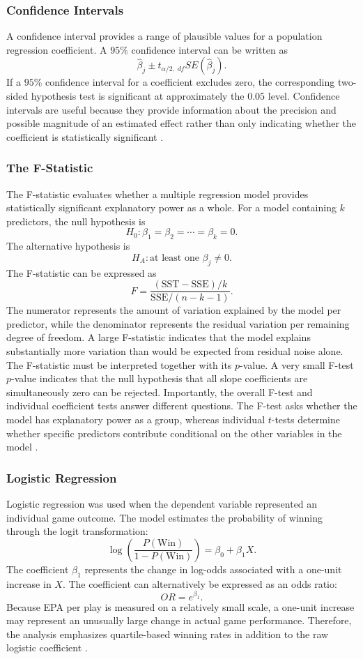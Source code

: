 \documentclass[11pt]{article}
\begin{document}
\subsubsection*{Confidence Intervals} 
A confidence interval provides a range of plausible values for a population regression coefficient. A $95\%$ confidence interval can be written as \[ \hat{\beta}_j \pm t_{\alpha/2,\;df} SE(\hat{\beta}_j). \] If a $95\%$ confidence interval for a coefficient excludes zero, the corresponding two-sided hypothesis test is significant at approximately the $0.05$ level. Confidence intervals are useful because they provide information about the precision and possible magnitude of an estimated effect rather than only indicating whether the coefficient is statistically significant \cite{confidence_intervals}.

\subsubsection*{The F-Statistic} 
The F-statistic evaluates whether a multiple regression model provides statistically significant explanatory power as a whole. For a model containing $k$ predictors, the null hypothesis is \[ H_0: \beta_1=\beta_2=\cdots=\beta_k=0. \] The alternative hypothesis is \[ H_A: \text{at least one }\beta_j\neq0. \] The F-statistic can be expressed as \[ F = \frac{(\mathrm{SST}-\mathrm{SSE})/k} {\mathrm{SSE}/(n-k-1)}. \] The numerator represents the amount of variation explained by the model per predictor, while the denominator represents the residual variation per remaining degree of freedom. A large F-statistic indicates that the model explains substantially more variation than would be expected from residual noise alone. The F-statistic must be interpreted together with its $p$-value. A very small F-test $p$-value indicates that the null hypothesis that all slope coefficients are simultaneously zero can be rejected. Importantly, the overall F-test and individual coefficient tests answer different questions. The F-test asks whether the model has explanatory power as a group, whereas individual $t$-tests determine whether specific predictors contribute conditional on the other variables in the model \cite{fstatistic}.

\subsubsection*{Logistic Regression} 
Logistic regression was used when the dependent variable represented an individual game outcome. The model estimates the probability of winning through the logit transformation: \[ \log \left( \frac{P(\text{Win})} {1-P(\text{Win})} \right) = \beta_0+\beta_1X. \] The coefficient $\beta_1$ represents the change in log-odds associated with a one-unit increase in $X$. The coefficient can alternatively be expressed as an odds ratio: \[ OR=e^{\beta_1}. \] Because EPA per play is measured on a relatively small scale, a one-unit increase may represent an unusually large change in actual game performance. Therefore, the analysis emphasizes quartile-based winning rates in addition to the raw logistic coefficient \cite{logistic_regression}.
\end{document}
